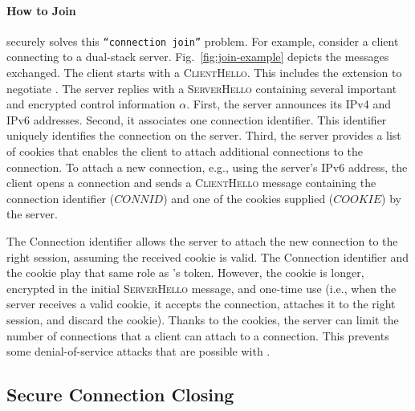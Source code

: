 \paragraph*{How to Join}

\tcpls securely solves this \texttt{``connection join''} problem. For example,
consider a client connecting to a dual-stack server. Fig.~\ref{fig:join-example}
depicts the \tls messages exchanged.  The client starts with a
\textsc{ClientHello}. This includes the \tcpls extension to negotiate \tcpls.
The server replies with a \textsc{ServerHello} containing several important and
encrypted control information $\alpha$. First, the server announces its IPv4 and
IPv6 addresses. Second, it associates one connection identifier.  This
identifier uniquely identifies the connection on the server. Third, the server
provides a list of cookies that enables the client to attach additional \tcp
connections to the \tcpls connection. To attach a new connection, e.g., using
the server's IPv6 address, the client opens a \tcp connection and sends a
\textsc{ClientHello} message containing the connection identifier ($CONNID$) and
one of the cookies supplied ($COOKIE$) by the server.

The Connection identifier allows the server to attach the new \tcp connection to
the right \tcpls session, assuming the received cookie is valid. The Connection
identifier and the cookie play that same role as \mptcp's token. However, the
cookie is longer, encrypted in the initial \textsc{ServerHello} message, and
one-time use (i.e., when the server receives a valid cookie, it accepts the
connection, attaches it to the right \tcpls session, and discard the cookie).
Thanks to the cookies, the server can limit the number of \tcp connections that
a client can attach to a \tcpls connection. This prevents some denial-of-service
attacks that are possible with \mptcp.

\subsection{Secure Connection Closing}



